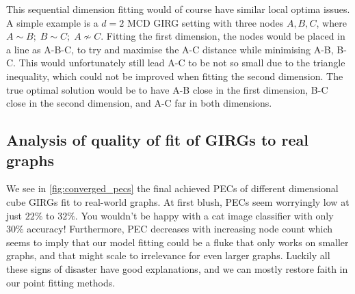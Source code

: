 This sequential dimension fitting would of course have similar local optima issues. A simple example is a $d=2$ MCD GIRG setting with three nodes $A,B,C$, where $A \sim B;\; B \sim C;\; A \nsim C$. Fitting the first dimension, the nodes would be placed in a line as A-B-C, to try and maximise the A-C distance while minimising A-B, B-C. This would unfortunately still lead A-C to be not so small due to the triangle inequality, which could not be improved when fitting the second dimension. The true optimal solution would be to have A-B close in the first dimension, B-C close in the second dimension, and A-C far in both dimensions.


\subsection{Analysis of quality of fit of GIRGs to real graphs}
\label{subsec:analysis_of_pec_fits}
We see in \cref{fig:converged_pecs} the final achieved PECs of different dimensional cube GIRGs fit to real-world graphs. At first blush, PECs seem worryingly low at just $22\%$ to $32\%$. You wouldn't be happy with a cat image classifier with only $30\%$ accuracy!
Furthermore, PEC decreases with increasing node count which seems to imply that our model fitting could be a fluke that only works on smaller graphs, and that might scale to irrelevance for even larger graphs.
Luckily all these signs of disaster have good explanations, and we can mostly restore faith in our point fitting methods.



